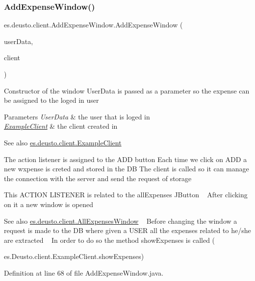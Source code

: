 \subsubsection{\texorpdfstring{Add\+Expense\+Window()}{AddExpenseWindow()}}
{\footnotesize\ttfamily es.\+deusto.\+client.\+Add\+Expense\+Window.\+Add\+Expense\+Window (\begin{DoxyParamCaption}\item[{\hyperlink{classes_1_1deusto_1_1serialization_1_1_user_data}{User\+Data}}]{user\+Data,  }\item[{\hyperlink{classes_1_1deusto_1_1client_1_1_example_client}{Example\+Client}}]{client }\end{DoxyParamCaption})}

Constructor of the window User\+Data is passed as a parameter so the expense can be assigned to the loged in user 
\begin{DoxyParams}{Parameters}
{\em User\+Data} & the user that is loged in \\
\hline
{\em \hyperlink{classes_1_1deusto_1_1client_1_1_example_client}{Example\+Client}} & the client created in \\
\hline
\end{DoxyParams}
\begin{DoxySeeAlso}{See also}
\hyperlink{classes_1_1deusto_1_1client_1_1_example_client}{es.\+deusto.\+client.\+Example\+Client} 
\end{DoxySeeAlso}
The action listener is assigned to the A\+DD button Each time we click on A\+DD a new wxpense is creted and stored in the DB The client is called so it can manage the connection with the server and send the request of storage

This A\+C\+T\+I\+ON L\+I\+S\+T\+E\+N\+ER is related to the all\+Expenses J\+Button ~\newline
After clicking on it a new window is opened \begin{DoxySeeAlso}{See also}
\hyperlink{classes_1_1deusto_1_1client_1_1_all_expenses_window}{es.\+deusto.\+client.\+All\+Expenses\+Window} ~\newline
Before changing the window a request is made to the DB where given a U\+S\+ER all the expenses related to he/she are extracted ~\newline
In order to do so the method show\+Expenses is called (

es.\+Deusto.\+client.\+Example\+Client.\+show\+Expenses)
\end{DoxySeeAlso}


Definition at line 68 of file Add\+Expense\+Window.\+java.



